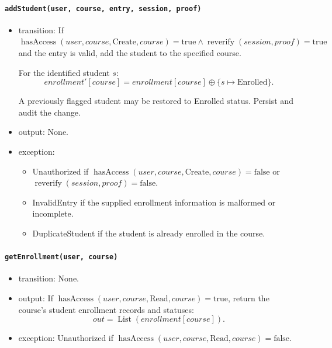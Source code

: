 \documentclass[12pt, titlepage]{article}
\begin{document}
\paragraph{\texttt{addStudent(user, course, entry, session, proof)}}
\begin{itemize}
    \item transition: If $\operatorname{hasAccess}(user,course,\text{Create},course)=\text{true}\land\operatorname{reverify}(session,proof)=\text{true}$ and the entry is valid, add the student to the specified course.

    For the identified student $s$:
    \[
    \mathit{enrollment}'[course]
    =
    \mathit{enrollment}[course]
    \oplus\{s\mapsto\text{Enrolled}\}.
    \]

    A previously flagged student may be
    restored to Enrolled status.
    Persist and audit the change.

    \item output: None.

    \item exception:
    \begin{itemize}
        \item Unauthorized if $\operatorname{hasAccess}(user,course,\text{Create},course)=\text{false}$ or $\operatorname{reverify}(session,proof)=\text{false}$.
        \item InvalidEntry if the supplied enrollment information is malformed or incomplete.
        \item DuplicateStudent if the student is already enrolled in the course.
    \end{itemize}
\end{itemize}

\paragraph{\texttt{getEnrollment(user, course)}}
\begin{itemize}
    \item transition: None.

    \item output: If $\operatorname{hasAccess}(user,course,\text{Read},course)=\text{true}$, return the course's
    student enrollment records and statuses:
    \[
    out=\operatorname{List}
    (\mathit{enrollment}[course]).
    \]

    \item exception: Unauthorized if $\operatorname{hasAccess}(user,course,\text{Read},course)=\text{false}$.
\end{itemize}
\end{document}

